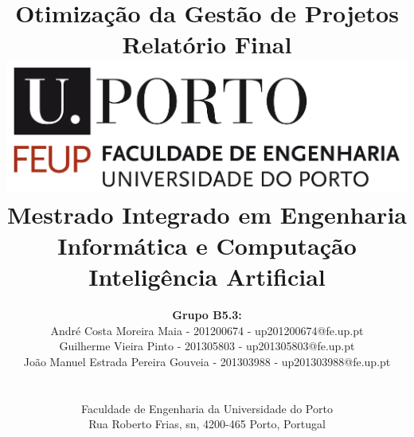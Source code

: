 \documentclass[a4paper]{article}
\begin{document}
\setlength{\textwidth}{16cm}
\setlength{\textheight}{22cm}

\title{\Huge\textbf{Otimização da Gestão de Projetos}\linebreak\linebreak\linebreak
\Large\textbf{Relatório Final}\linebreak\linebreak
\linebreak\linebreak
\includegraphics[scale=0.1]{feup-logo.png}\linebreak\linebreak
\linebreak\linebreak
\Large{Mestrado Integrado em Engenharia Informática e Computação} \linebreak\linebreak
\Large{Inteligência Artificial}\linebreak
}

\author{\textbf{Grupo B5.3:}\\ André Costa Moreira Maia - 201200674 - up201200674@fe.up.pt \\ Guilherme Vieira Pinto - 201305803 - up201305803@fe.up.pt \\ João Manuel Estrada Pereira Gouveia - 201303988 - up201303988@fe.up.pt \\ \linebreak\linebreak \\
 \\ Faculdade de Engenharia da Universidade do Porto \\ Rua Roberto Frias, s\/n, 4200-465 Porto, Portugal \linebreak\linebreak\linebreak
\linebreak\linebreak\vspace{1cm}}
\maketitle
\thispagestyle{empty}
\end{document}
